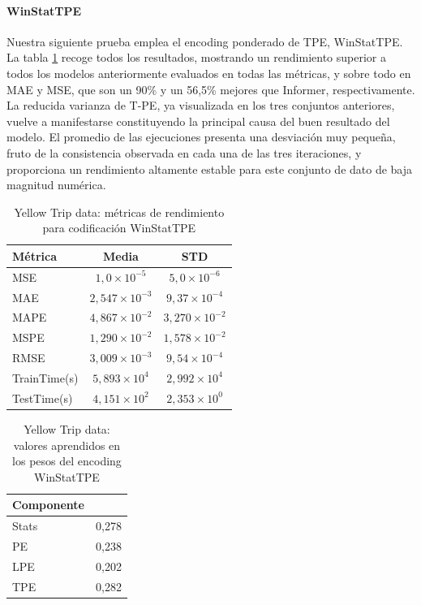 \paragraph{WinStatTPE}

Nuestra siguiente prueba emplea el encoding ponderado de TPE, WinStatTPE. La tabla \ref{taxitpe} recoge todos los resultados, mostrando un rendimiento superior a todos los modelos anteriormente evaluados en todas las métricas, y sobre todo en MAE y MSE, que son un 90\% y un 56,5\% mejores que Informer, respectivamente. La reducida varianza de T-PE, ya visualizada en los tres conjuntos anteriores, vuelve a manifestarse constituyendo la principal causa del buen resultado del modelo. El promedio de las ejecuciones presenta una desviación muy pequeña, fruto de la consistencia observada en cada una de las tres iteraciones, y proporciona un rendimiento altamente estable para este conjunto de dato de baja magnitud numérica.\\

\begin{table}[!ht]
	\centering
	\begin{tabular}{l|c|c}
		\toprule
		Métrica & Media & STD \\
		\midrule
		MSE & $1,0 \times 10^{-5}$ & $5,0 \times 10^{-6}$ \\
		MAE & $2,547 \times 10^{-3}$ & $9,37 \times 10^{-4}$ \\
		MAPE & $4,867 \times 10^{-2}$ & $3,270 \times 10^{-2}$ \\
		MSPE & $1,290 \times 10^{-2}$ & $1,578 \times 10^{-2}$ \\
		RMSE & $3,009 \times 10^{-3}$ & $9,54 \times 10^{-4}$ \\
		TrainTime(s) & $5,893 \times 10^{4}$ & $2,992 \times 10^{4}$ \\
		TestTime(s) & $4,151 \times 10^{2}$ & $2,353 \times 10^{0}$ \\
		\bottomrule
	\end{tabular}
	\caption{Yellow Trip data: métricas de rendimiento para codificación WinStatTPE}
	\label{taxitpe}
\end{table}


\begin{table}[!ht]
	\centering
		\begin{tabular}{l|N}
		\toprule
		Componente &  \\
		\midrule
		Stats & 0,278 \\
		PE & 0,238 \\
		LPE & 0,202 \\
		TPE & 0,282 \\
		\bottomrule
	\end{tabular}
	\caption{Yellow Trip data: valores aprendidos en los pesos del encoding WinStatTPE}
	\label{taxitpepesos}
\end{table}


